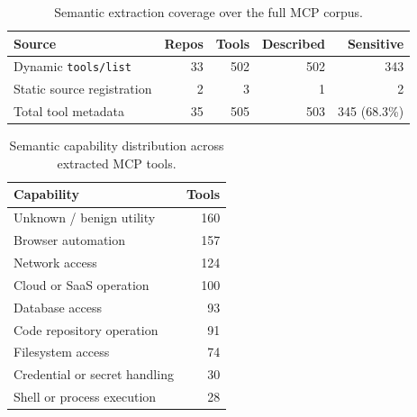 
\begin{table}[t]
\centering
\caption{Semantic extraction coverage over the full MCP corpus.}
\label{tab:semantic-full-coverage}
\begin{tabular}{lrrrr}
\toprule
Source & Repos & Tools & Described & Sensitive \\
\midrule
Dynamic \texttt{tools/list} & 33 & 502 & 502 & 343 \\
Static source registration & 2 & 3 & 1 & 2 \\
\midrule
Total tool metadata & 35 & 505 & 503 & 345 (68.3\%) \\
\bottomrule
\end{tabular}
\end{table}

\begin{table}[t]
\centering
\caption{Semantic capability distribution across extracted MCP tools.}
\label{tab:semantic-full-capabilities}
\begin{tabular}{lr}
\toprule
Capability & Tools \\
\midrule
Unknown / benign utility & 160 \\
Browser automation & 157 \\
Network access & 124 \\
Cloud or SaaS operation & 100 \\
Database access & 93 \\
Code repository operation & 91 \\
Filesystem access & 74 \\
Credential or secret handling & 30 \\
Shell or process execution & 28 \\
\bottomrule
\end{tabular}
\end{table}
